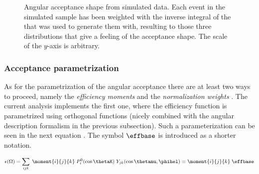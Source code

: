 \begin{figure}[h]
  \centering
  \begin{subfigure}{0.49\textwidth}
    \scalebox{1.3}{}
    \caption{}
    \label{angAcc_ctk}
  \end{subfigure}%
  \hfill%
  \begin{subfigure}{0.49\textwidth}
    \scalebox{1.3}{}
    \caption{}
    \label{angAcc_ctl}
  \end{subfigure}

  \vspace*{0.02\textwidth}
  \begin{subfigure}{0.49\textwidth}
    \scalebox{1.3}{}
    \caption{}
    \label{angAcc_phi}
  \end{subfigure}
  \caption{Angular acceptance shape from simulated data. Each event in the simulated sample has been weighted with the inverse integral 
           of the \pdf that was used to generate them with, resulting to those three distributions that give a feeling of the acceptance shape.
           The scale of the $y$-axis is arbitrary.}
\end{figure}

\subsubsection{Acceptance parametrization}
\label{Acceptance parametrization}
As for the parametrization of the angular acceptance there are at least two ways to proceed,
namely the \emph{efficiency moments} \cite{jeroenThesis} and the \emph{normalization weights} \cite{tristanThesis,jeroenThesis}. 
The current analysis implements the first one, where the efficiency function is parametrized using orthogonal functions (nicely
combined with the angular description formalism in the previous subsection). Such a parameterization can be seen in the next equation 
. The symbol $\effbase$ is introduced as a shorter notation.

\begin{center}
\begin{equation}
  \epsilon(\Omega) = \sum_{ijk} \; \moment{i}{j}{k} \; P_i^0(\cos\thetaK) \; Y_{jk}(\cos\thetamu,\phihel) \equiv \moment{i}{j}{k} \; \effbase
  \label{eff_func}
\end{equation}
\end{center}

